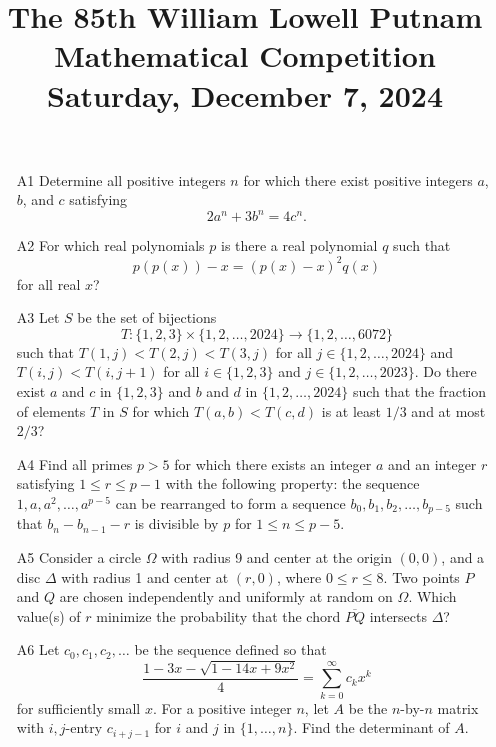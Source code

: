 \documentclass[amssymb,twocolumn,pra,10pt,aps,nofootinbib]{revtex4-1}
\begin{document}
\title{The 85th William Lowell Putnam Mathematical Competition \\
    Saturday, December 7, 2024}
\maketitle

\begin{itemize}

\item[A1]
Determine all positive integers $n$ for which there exist positive integers $a$, $b$, and $c$ satisfying
\[
2a^n + 3b^n = 4c^n.
\]

\item[A2]
For which real polynomials $p$ is there a real polynomial $q$ such that
\[
p(p(x)) - x = (p(x) - x)^2 q(x)
\]
for all real $x$?

\item[A3]
Let $S$ be the set of bijections
\[
T \colon \{1,2,3\} \times \{1,2,\dots,2024\} \to \{1,2,\dots,6072\}
\]
such that $T(1,j) < T(2,j) < T(3,j)$ for all $j \in \{1,2,\dots,2024\}$ and $T(i,j) < T(i,j+1)$ for all $i \in \{1,2,3\}$ and $j \in \{1,2,\dots,2023\}$. Do there exist $a$ and $c$ in $\{1,2,3\}$ and $b$ and $d$ in $\{1,2,\dots,2024\}$ such that the fraction of elements $T$ in $S$ for which $T(a,b) < T(c,d)$ is at least $1/3$ and at most $2/3$?

\item[A4]
Find all primes $p > 5$ for which there exists an integer $a$ and an integer $r$ satisfying $1 \leq r \leq p-1$ with the following property: the sequence $1,a,a^2,\dots,a^{p-5}$ can be rearranged to form a sequence $b_0,b_1,b_2,\dots,b_{p-5}$ such that $b_n-b_{n-1}-r$ is divisible by $p$ for $1 \leq n \leq p-5$.
 
\item[A5]
Consider a circle $\Omega$ with radius 9 and center at the origin $(0,0)$, and a disc $\Delta$ with radius 1 and center at $(r,0)$, where $0 \leq r \leq 8$. Two points $P$ and $Q$ are chosen independently and uniformly at random on $\Omega$. Which value(s) of $r$ minimize the probability that the chord $\overline{PQ}$ intersects $\Delta$?

\item[A6]
Let $c_0,c_1,c_2,\dots$ be the sequence defined so that 
\[
\frac{1-3x-\sqrt{1-14x+9x^2}}{4} = \sum_{k=0}^\infty c_k x^k
\]
for sufficiently small $x$. For a positive integer $n$, let $A$ be the $n$-by-$n$ matrix with $i,j$-entry $c_{i+j-1}$ for $i$ and $j$ in $\{1,\dots,n\}$. Find the determinant of $A$.


\end{itemize}
\end{document}
